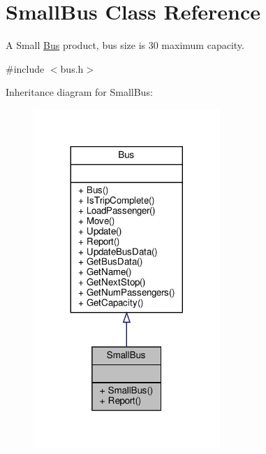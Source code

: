 \hypertarget{classSmallBus}{}\section{Small\+Bus Class Reference}
\label{classSmallBus}


A Small \hyperlink{classBus}{Bus} product, bus size is 30 maximum capacity.  




{\ttfamily \#include $<$bus.\+h$>$}



Inheritance diagram for Small\+Bus\+:\nopagebreak
\begin{figure}[H]
\begin{center}
\leavevmode
\includegraphics[width=200pt]{classSmallBus__inherit__graph}
\end{center}
\end{figure}


